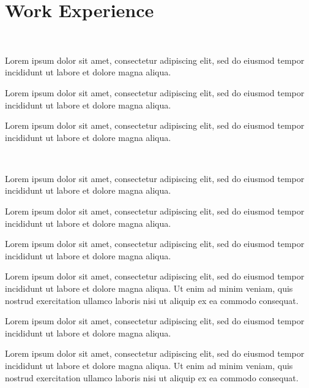 \documentclass[]{deedy-resume-openfont}
\begin{document}
\begin{minipage}[t]{0.62\textwidth}


    \section{Work Experience}

    \noindent {}
    \\
    \justifying \noindent \begin{tightemize}
        \item Lorem ipsum dolor sit amet, consectetur adipiscing elit, sed do eiusmod tempor incididunt ut labore et dolore magna aliqua.
        \item Lorem ipsum dolor sit amet, consectetur adipiscing elit, sed do eiusmod tempor incididunt ut labore et dolore magna aliqua.
        \item Lorem ipsum dolor sit amet, consectetur adipiscing elit, sed do eiusmod tempor incididunt ut labore et dolore magna aliqua.
    \end{tightemize}
    \sectionsep

    \noindent {}
    \\
    \vspace{-\topsep} %
    \justifying \noindent \begin{tightemize}
        \item Lorem ipsum dolor sit amet, consectetur adipiscing elit, sed do eiusmod tempor incididunt ut labore et dolore magna aliqua.
        \item Lorem ipsum dolor sit amet, consectetur adipiscing elit, sed do eiusmod tempor incididunt ut labore et dolore magna aliqua.
        \item Lorem ipsum dolor sit amet, consectetur adipiscing elit, sed do eiusmod tempor incididunt ut labore et dolore magna aliqua.
        \item Lorem ipsum dolor sit amet, consectetur adipiscing elit, sed do eiusmod tempor incididunt ut labore et dolore magna aliqua. Ut enim ad minim veniam, quis nostrud exercitation ullamco laboris nisi ut aliquip ex ea commodo consequat.
        \item Lorem ipsum dolor sit amet, consectetur adipiscing elit, sed do eiusmod tempor incididunt ut labore et dolore magna aliqua.
        \item Lorem ipsum dolor sit amet, consectetur adipiscing elit, sed do eiusmod tempor incididunt ut labore et dolore magna aliqua. Ut enim ad minim veniam, quis nostrud exercitation ullamco laboris nisi ut aliquip ex ea commodo consequat.
    \end{tightemize}
    \sectionsep


\end{minipage}
\end{document}
